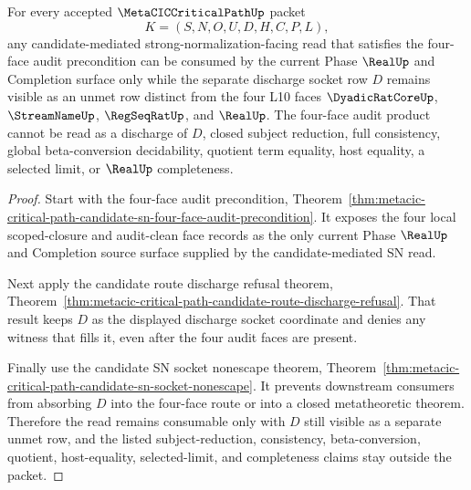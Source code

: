 \begin{theorem}
\label{thm:metacic-critical-path-four-face-discharge-precondition-strengthening}
For every accepted $\MetaCICCriticalPathUp$ packet
$$
K=(S,N,O,U,D,H,C,P,L),
$$
any candidate-mediated strong-normalization-facing read that satisfies the four-face audit precondition can be consumed by the current Phase $\RealUp$ and Completion surface only while the separate discharge socket row $D$ remains visible as an unmet row distinct from the four L10 faces $\DyadicRatCoreUp$, $\StreamNameUp$, $\RegSeqRatUp$, and $\RealUp$. The four-face audit product cannot be read as a discharge of $D$, closed subject reduction, full consistency, global beta-conversion decidability, quotient term equality, host equality, a selected limit, or $\RealUp$ completeness.
\end{theorem}
\begin{proof}
Start with the four-face audit precondition, Theorem~\ref{thm:metacic-critical-path-candidate-sn-four-face-audit-precondition}. It exposes the four local scoped-closure and audit-clean face records as the only current Phase $\RealUp$ and Completion source surface supplied by the candidate-mediated SN read.

Next apply the candidate route discharge refusal theorem, Theorem~\ref{thm:metacic-critical-path-candidate-route-discharge-refusal}. That result keeps $D$ as the displayed discharge socket coordinate and denies any witness that fills it, even after the four audit faces are present.

Finally use the candidate SN socket nonescape theorem, Theorem~\ref{thm:metacic-critical-path-candidate-sn-socket-nonescape}. It prevents downstream consumers from absorbing $D$ into the four-face route or into a closed metatheoretic theorem. Therefore the read remains consumable only with $D$ still visible as a separate unmet row, and the listed subject-reduction, consistency, beta-conversion, quotient, host-equality, selected-limit, and completeness claims stay outside the packet.
\end{proof}

